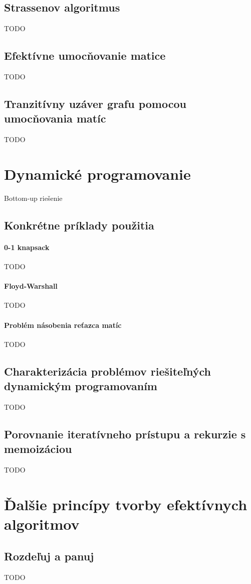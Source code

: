 	\subsection{Strassenov algoritmus} TODO
	\subsection{Efektívne umocňovanie matice} TODO
	\subsection{Tranzitívny uzáver grafu pomocou umocňovania matíc} TODO


\section{Dynamické programovanie}
	Bottom-up riešenie
	\subsection{Konkrétne príklady použitia} 
		\paragraph{0-1 knapsack} TODO
		\paragraph{Floyd-Warshall} TODO
		\paragraph{Problém násobenia reťazca matíc} TODO

	\subsection{Charakterizácia problémov riešiteľných dynamickým programovaním} TODO
	\subsection{Porovnanie iteratívneho prístupu a rekurzie s memoizáciou} TODO


\section{Ďalšie princípy tvorby efektívnych algoritmov}
	\subsection{Rozdeľuj a panuj}
	TODO
